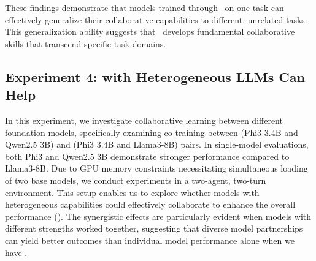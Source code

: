 These findings demonstrate that models trained through \ours~on one task can effectively generalize their collaborative capabilities to different, unrelated tasks. This generalization ability suggests that \ours~develops fundamental collaborative skills that transcend specific task domains.



\subsection{{Experiment 4: \oursspace with Heterogeneous LLMs Can Help}}
\label{sec:exp4}
In this experiment, we investigate collaborative learning between different foundation models, specifically examining co-training between (Phi3 3.4B and Qwen2.5 3B) and (Phi3 3.4B and Llama3-8B) pairs. In single-model evaluations, both Phi3 and Qwen2.5 3B demonstrate stronger performance compared to Llama3-8B. Due to GPU memory constraints necessitating simultaneous loading of two base models, we conduct experiments in a two-agent, two-turn environment. This setup enables us to explore whether models with heterogeneous capabilities could effectively collaborate to enhance the overall performance (). The synergistic effects are particularly evident when models with different strengths worked together, suggesting that diverse model partnerships can yield better outcomes than individual model performance alone when we have \ours. 


